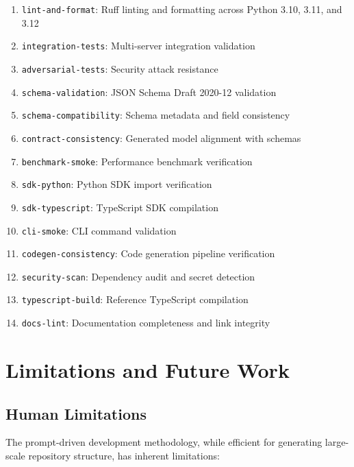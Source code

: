 \documentclass{article}
\begin{document}
\begin{enumerate}[leftmargin=*]
\item \texttt{lint-and-format}: Ruff linting and formatting across Python 3.10, 3.11, and 3.12
\item \texttt{integration-tests}: Multi-server integration validation
\item \texttt{adversarial-tests}: Security attack resistance
\item \texttt{schema-validation}: JSON Schema Draft 2020-12 validation
\item \texttt{schema-compatibility}: Schema metadata and field consistency
\item \texttt{contract-consistency}: Generated model alignment with schemas
\item \texttt{benchmark-smoke}: Performance benchmark verification
\item \texttt{sdk-python}: Python SDK import verification
\item \texttt{sdk-typescript}: TypeScript SDK compilation
\item \texttt{cli-smoke}: CLI command validation
\item \texttt{codegen-consistency}: Code generation pipeline verification
\item \texttt{security-scan}: Dependency audit and secret detection
\item \texttt{typescript-build}: Reference TypeScript compilation
\item \texttt{docs-lint}: Documentation completeness and link integrity
\end{enumerate}

\section{Limitations and Future Work}
\label{sec:limitations}

\subsection{Human Limitations}

The prompt-driven development methodology, while efficient for generating large-scale repository structure, has inherent limitations:
\end{document}
